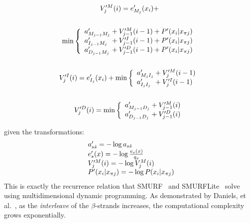 \documentclass{acm_proc_article-sp}
\begin{document}
\begin{small}
\begin{multline}\label{viterbi-final}
V_{j}^{\prime M}(i) = e^{\prime}_{M_{j}}(x_{i}) + \notag
\\\notag\\ \min \left\{
  \begin{array}{l@{}c@{}l}
  \vsum{V_{j-1}^{\prime M}(i-1)} {a^{\prime}_{M_{j-1}M_{j}}} + P'(x_{i}|x_{\pi j})\\
  \vsum{V_{j-1}^{\prime I}(i-1)} {a^{\prime}_{I_{j-1}M_{j}}} + P'(x_{i}|x_{\pi j})\\
  \vsum{V_{j-1}^{\prime D}(i-1)} {a^{\prime}_{D_{j-1}M_{j}}} + P'(x_{i}|x_{\pi j})\\
  \end{array} \right.\\\\
V_{j}^{\prime I}(i) = e^{\prime}_{I_{j}}(x_{i}) + \min \left\{
  \begin{array}{l@{}c@{}l}
  \vsum{V_{j}^{\prime M}(i - 1)} {a^{\prime}_{M_{j}I_{j}}}\\
  \vsum{V_{j}^{\prime I}(i - 1)} {a^{\prime}_{I_{j}I_{j}}}\\
  \end{array} \right.\\\\
V_{j}^{\prime D}(i) = \min \left\{
  \begin{array}{l@{}c@{}l}
  \vsum{V_{j-1}^{\prime M}(i)} {a^{\prime}_{M_{j-1}D_{j}}}\\
  \vsum{V_{j-1}^{\prime D}(i)} {a^{\prime}_{D_{j-1}D_{j}}}\\
  \end{array} \right.\\
\end{multline}
\end{small}
given the transformations:
\begin{equation*}
  \begin{array}{l@{}c@{}l@{}}
  a'_{s \hat{s}} = - \log a_{s \hat{s}} \\
  e^{\prime}_{s}(x) = - \log\frac{e_{s}(x)}{q_{x}}\\
  V_j^{\prime M}(i) = - \log V_j^{M}(i)\\
  P^{\prime}(x_{i}|x_{\pi j}) = - \log P(x_{i}|x_{\pi j})
  \end{array}\\
\end{equation*}
This is exactly the recurrence relation that SMURF~\cite{Menke:2010ti} and 
SMURFLite~\cite{Daniels:2012dg} solve using multidimensional dynamic 
programming.
As demonstrated by Daniels, et al.~\cite{Daniels:2012dg}, as the 
\emph{interleave} 
of the $\beta$-strands increases, the computational complexity grows 
exponentially.
\end{document}
